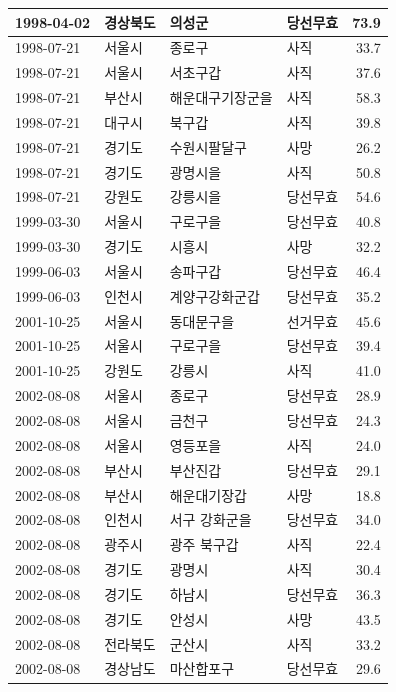 \documentclass[
  11pt,
  letter]{article}
\begin{document}
\begin{longtable}[t]{l|l|l|l|r}
\hline
1998-04-02 & 경상북도 & 의성군 & 당선무효 & 73.9\\
\hline
1998-07-21 & 서울시 & 종로구 & 사직 & 33.7\\
\hline
1998-07-21 & 서울시 & 서초구갑 & 사직 & 37.6\\
\hline
1998-07-21 & 부산시 & 해운대구기장군을 & 사직 & 58.3\\
\hline
1998-07-21 & 대구시 & 북구갑 & 사직 & 39.8\\
\hline
1998-07-21 & 경기도 & 수원시팔달구 & 사망 & 26.2\\
\hline
1998-07-21 & 경기도 & 광명시을 & 사직 & 50.8\\
\hline
1998-07-21 & 강원도 & 강릉시을 & 당선무효 & 54.6\\
\hline
1999-03-30 & 서울시 & 구로구을 & 당선무효 & 40.8\\
\hline
1999-03-30 & 경기도 & 시흥시 & 사망 & 32.2\\
\hline
1999-06-03 & 서울시 & 송파구갑 & 당선무효 & 46.4\\
\hline
1999-06-03 & 인천시 & 계양구강화군갑 & 당선무효 & 35.2\\
\hline
2001-10-25 & 서울시 & 동대문구을 & 선거무효 & 45.6\\
\hline
2001-10-25 & 서울시 & 구로구을 & 당선무효 & 39.4\\
\hline
2001-10-25 & 강원도 & 강릉시 & 사직 & 41.0\\
\hline
2002-08-08 & 서울시 & 종로구 & 당선무효 & 28.9\\
\hline
2002-08-08 & 서울시 & 금천구 & 당선무효 & 24.3\\
\hline
2002-08-08 & 서울시 & 영등포을 & 사직 & 24.0\\
\hline
2002-08-08 & 부산시 & 부산진갑 & 당선무효 & 29.1\\
\hline
2002-08-08 & 부산시 & 해운대기장갑 & 사망 & 18.8\\
\hline
2002-08-08 & 인천시 & 서구 강화군을 & 당선무효 & 34.0\\
\hline
2002-08-08 & 광주시 & 광주 북구갑 & 사직 & 22.4\\
\hline
2002-08-08 & 경기도 & 광명시 & 사직 & 30.4\\
\hline
2002-08-08 & 경기도 & 하남시 & 당선무효 & 36.3\\
\hline
2002-08-08 & 경기도 & 안성시 & 사망 & 43.5\\
\hline
2002-08-08 & 전라북도 & 군산시 & 사직 & 33.2\\
\hline
2002-08-08 & 경상남도 & 마산합포구 & 당선무효 & 29.6\\

\end{longtable}
\end{document}
